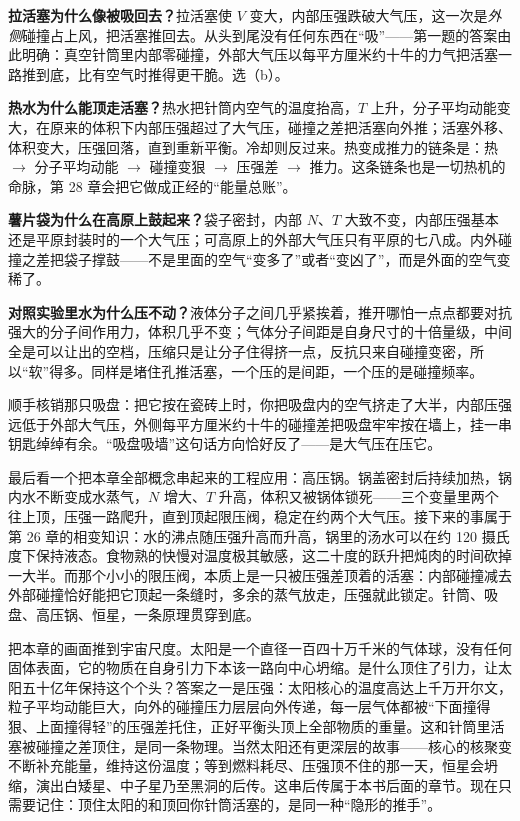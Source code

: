 \textbf{拉活塞为什么像被吸回去？}拉活塞使 \(V\) 变大，内部压强跌破大气压，这一次是\emph{外侧}碰撞占上风，把活塞推回去。从头到尾没有任何东西在“吸”——第一题的答案由此明确：真空针筒里内部零碰撞，外部大气压以每平方厘米约十牛的力气把活塞一路推到底，比有空气时推得更干脆。选（b）。

\textbf{热水为什么能顶走活塞？}热水把针筒内空气的温度抬高，\(T\) 上升，分子平均动能变大，在原来的体积下内部压强超过了大气压，碰撞之差把活塞向外推；活塞外移、体积变大，压强回落，直到重新平衡。冷却则反过来。热变成推力的链条是：热 \(\rightarrow\) 分子平均动能 \(\rightarrow\) 碰撞变狠 \(\rightarrow\) 压强差 \(\rightarrow\) 推力。这条链条也是一切热机的命脉，第 28 章会把它做成正经的“能量总账”。

\textbf{薯片袋为什么在高原上鼓起来？}袋子密封，内部 \(N\)、\(T\) 大致不变，内部压强基本还是平原封装时的一个大气压；可高原上的外部大气压只有平原的七八成。内外碰撞之差把袋子撑鼓——不是里面的空气“变多了”或者“变凶了”，而是外面的空气变稀了。

\textbf{对照实验里水为什么压不动？}液体分子之间几乎紧挨着，推开哪怕一点点都要对抗强大的分子间作用力，体积几乎不变；气体分子间距是自身尺寸的十倍量级，中间全是可以让出的空档，压缩只是让分子住得挤一点，反抗只来自碰撞变密，所以“软”得多。同样是堵住孔推活塞，一个压的是间距，一个压的是碰撞频率。

顺手核销那只吸盘：把它按在瓷砖上时，你把吸盘内的空气挤走了大半，内部压强远低于外部大气压，外侧每平方厘米约十牛的碰撞差把吸盘牢牢按在墙上，挂一串钥匙绰绰有余。“吸盘吸墙”这句话方向恰好反了——是大气压在压它。

最后看一个把本章全部概念串起来的工程应用：高压锅。锅盖密封后持续加热，锅内水不断变成水蒸气，\(N\) 增大、\(T\) 升高，体积又被锅体锁死——三个变量里两个往上顶，压强一路爬升，直到顶起限压阀，稳定在约两个大气压。接下来的事属于第 26 章的相变知识：水的沸点随压强升高而升高，锅里的汤水可以在约 120 摄氏度下保持液态。食物熟的快慢对温度极其敏感，这二十度的跃升把炖肉的时间砍掉一大半。而那个小小的限压阀，本质上是一只被压强差顶着的活塞：内部碰撞减去外部碰撞恰好能把它顶起一条缝时，多余的蒸气放走，压强就此锁定。针筒、吸盘、高压锅、恒星，一条原理贯穿到底。


\begin{thought}[用气体压强顶住一颗恒星]
把本章的画面推到宇宙尺度。太阳是一个直径一百四十万千米的气体球，没有任何固体表面，它的物质在自身引力下本该一路向中心坍缩。是什么顶住了引力，让太阳五十亿年保持这个个头？答案之一是压强：太阳核心的温度高达上千万开尔文，粒子平均动能巨大，向外的碰撞压力层层向外传递，每一层气体都被“下面撞得狠、上面撞得轻”的压强差托住，正好平衡头顶上全部物质的重量。这和针筒里活塞被碰撞之差顶住，是同一条物理。当然太阳还有更深层的故事——核心的核聚变不断补充能量，维持这份温度；等到燃料耗尽、压强顶不住的那一天，恒星会坍缩，演出白矮星、中子星乃至黑洞的后传。这串后传属于本书后面的章节。现在只需要记住：顶住太阳的和顶回你针筒活塞的，是同一种“隐形的推手”。
\end{thought}

